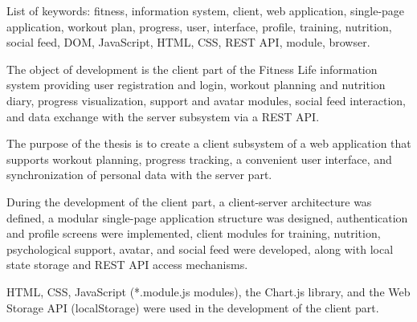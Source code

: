 List of keywords: fitness, information system, client, web application, single-page application, workout plan, progress, user, interface, profile, training, nutrition, social feed, DOM, JavaScript, HTML, CSS, REST API, module, browser.

The object of development is the client part of the Fitness Life information system providing user registration and login, workout planning and nutrition diary, progress visualization, support and avatar modules, social feed interaction, and data exchange with the server subsystem via a REST API.

The purpose of the thesis is to create a client subsystem of a web application that supports workout planning, progress tracking, a convenient user interface, and synchronization of personal data with the server part.

During the development of the client part, a client-server architecture was defined, a modular single-page application structure was designed, authentication and profile screens were implemented, client modules for training, nutrition, psychological support, avatar, and social feed were developed, along with local state storage and REST API access mechanisms.

HTML, CSS, JavaScript (*.module.js modules), the Chart.js library, and the Web Storage API (localStorage) were used in the development of the client part.
